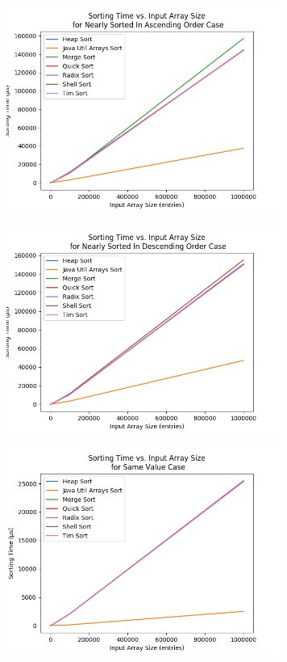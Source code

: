 \begin{figure}[!htp]
\centering
\includegraphics[width=9cm]{figures/plots_without_BubbleSort_InsertionSort/sorting_time_vs_input_array_size_NearlySortedInAscendingOrderCase.png}
\end{figure}

\begin{figure}[!htp]
\centering
\includegraphics[width=9cm]{figures/plots_without_BubbleSort_InsertionSort/sorting_time_vs_input_array_size_NearlySortedInDescendingOrderCase.png}
\end{figure}

\begin{figure}[!htp]
\centering
\includegraphics[width=9cm]{figures/plots_without_BubbleSort_InsertionSort/sorting_time_vs_input_array_size_SameValueCase.png}
\end{figure}


